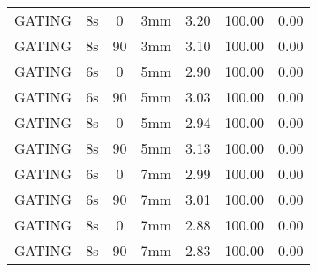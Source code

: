 \begin{table}[H]
\begin{tabular}{|c||c|c|c||c|c|c|}
GATING & 8s & 0 & 3mm & 3.20 & 100.00 & 0.00 \\
GATING & 8s & 90 & 3mm & 3.10 & 100.00 & 0.00 \\
GATING & 6s & 0 & 5mm & 2.90 & 100.00 & 0.00 \\
GATING & 6s & 90 & 5mm & 3.03 & 100.00 & 0.00 \\
GATING & 8s & 0 & 5mm & 2.94 & 100.00 & 0.00 \\
GATING & 8s & 90 & 5mm & 3.13 & 100.00 & 0.00 \\
GATING & 6s & 0 & 7mm & 2.99 & 100.00 & 0.00 \\
GATING & 6s & 90 & 7mm & 3.01 & 100.00 & 0.00 \\
GATING & 8s & 0 & 7mm & 2.88 & 100.00 & 0.00 \\
GATING & 8s & 90 & 7mm & 2.83 & 100.00 & 0.00 \\
    \hline\hline 
  \end{tabular}
\end{table}

\newpage

